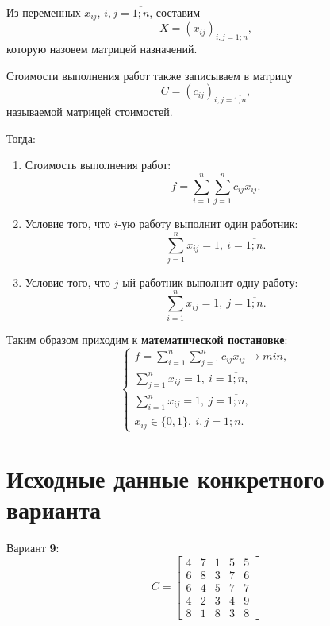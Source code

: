 \documentclass{bmstu}
\begin{document}
Из переменных $x_{ij}$, $i,j = \overline{1; n}$, составим 
\begin{equation}
    X = (x_{ij})_{i,j = \overline{1; n}},
\end{equation}
которую назовем матрицей назначений.

Стоимости выполнения работ также записываем в матрицу
\begin{equation}
    C = (c_{ij})_{i,j = \overline{1; n}},
\end{equation}
называемой матрицей стоимостей.

Тогда:
\begin{enumerate}
    \item Стоимость выполнения работ:
        \begin{equation}
            f = \sum_{i=1}^n \sum_{j=1}^n c_{ij} x_{ij}.
        \end{equation}
    \item Условие того, что $i$-ую работу выполнит один работник:
        \begin{equation}
            \sum_{j=1}^n x_{ij} = 1, \: i = \overline{1; n}.
        \end{equation}
    \item Условие того, что $j$-ый работник выполнит одну работу:
        \begin{equation}
            \sum_{i=1}^n x_{ij} = 1, \: j = \overline{1; n}.
        \end{equation}
\end{enumerate}

Таким образом приходим к \textbf{математической постановке}:
\begin{equation}
    \begin{cases}
        f = \sum_{i=1}^n \sum_{j=1}^n c_{ij} x_{ij} \rightarrow min, \\
        \sum_{j=1}^n x_{ij} = 1, \: i = \overline{1; n}, \\
        \sum_{i=1}^n x_{ij} = 1, \: j = \overline{1; n}, \\
        x_{ij} \in \{0, 1\}, \: i,j = \overline{1; n}.
    \end{cases}
\end{equation}

\section{Исходные данные конкретного варианта}

Вариант \textbf{9}:
\begin{equation}
    C = 
    \begin{bmatrix}
        4 & 7 & 1 & 5 & 5 \\
        6 & 8 & 3 & 7 & 6 \\
        6 & 4 & 5 & 7 & 7 \\
        4 & 2 & 3 & 4 & 9 \\
        8 & 1 & 8 & 3 & 8
    \end{bmatrix}
\end{equation}
\end{document}
